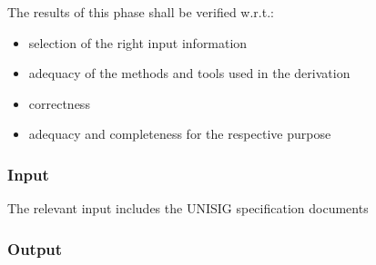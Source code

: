 \documentclass{template/openetcs_article}
\begin{document}
The results of this phase shall be verified w.r.t.:
\begin{itemize}
\item selection of the right input information
\item adequacy of the methods and tools used in the derivation
\item correctness
\item adequacy and completeness for the respective purpose
\end{itemize}
 

\subsubsection{Input}
\label{sec:1-input}

The relevant input includes the UNISIG specification documents
\cite{subset-026:3.3.0, subset-034:3.0.0, subset-088:2.3.0,
  subset-091:3.2.0, unisig_CCS}

\subsubsection{Output}
\label{sec:1-output}
\end{document}

